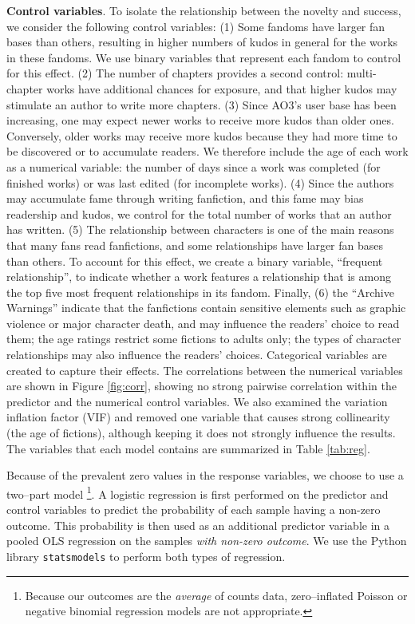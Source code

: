\documentclass[letterpaper]{article} %
\begin{document}
\textbf{Control variables}.   To isolate the relationship between the novelty and success, we consider the following control variables: (1) Some fandoms have larger fan bases than others, resulting in higher numbers of kudos in general for the works in these fandoms. We use binary variables that represent each fandom to control for this effect. (2) The number of chapters provides a second control: multi-chapter works have additional chances for exposure, and that higher kudos may stimulate an author to write more chapters. (3) Since AO3's user base has been increasing, one may expect newer works to receive more kudos than older ones. Conversely, older works may receive more kudos because they had more time to be discovered or to accumulate readers. We therefore include the age of each work as a numerical variable: the number of days since a work was completed (for finished works) or was last edited (for incomplete works). (4) Since the authors may accumulate fame through writing fanfiction, and this fame may bias readership and kudos,  we control for the total number of works that an author has written. (5) The relationship between characters is one of the main reasons that many fans read fanfictions, and some relationships have larger fan bases than others. To account for this effect, we create a binary variable, ``frequent relationship'', to indicate whether a work features a relationship that is among the top five most frequent relationships in its fandom. Finally, (6) the ``Archive Warnings'' indicate that the fanfictions contain sensitive elements such as graphic violence or major character death, and may influence the readers' choice to read them; the age ratings restrict some fictions to adults only; the types of character relationships may also influence the readers' choices. Categorical variables are created to capture their effects. The correlations between the numerical variables are shown in Figure \ref{fig:corr}, showing no strong pairwise correlation within the predictor and the numerical control variables. We also examined the variation inflation factor (VIF) and removed one variable that causes strong collinearity (the age of fictions), although keeping it does not strongly influence the results. The variables that each model contains are summarized in Table \ref{tab:reg}.

Because of the prevalent zero values in the response variables, we choose to use a two--part model \cite{jones2000health,humphreys2013dealing}\footnote{Because our outcomes are the \emph{average} of counts data, zero--inflated Poisson or negative binomial regression models are not appropriate.}. A logistic regression is first performed on the predictor and control variables to predict the probability of each sample having a non-zero outcome. This probability is then used as an additional predictor variable in a pooled OLS regression on the samples \emph{with non-zero outcome}. We use the Python library \texttt{statsmodels} \cite{seabold2010statsmodels} to perform both types of regression.
\end{document}
